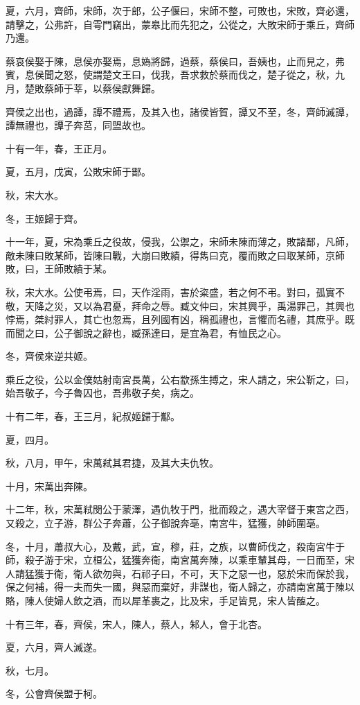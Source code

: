 \begin{pinyinscope}
夏，六月，齊師，宋師，次于郎，公子偃曰，宋師不整，可敗也，宋敗，齊必還，請擊之，公弗許，自雩門竊出，蒙皋比而先犯之，公從之，大敗宋師于乘丘，齊師乃還。

蔡哀侯娶于陳，息侯亦娶焉，息媯將歸，過蔡，蔡侯曰，吾姨也，止而見之，弗賓，息侯聞之怒，使謂楚文王曰，伐我，吾求救於蔡而伐之，楚子從之，秋，九月，楚敗蔡師于莘，以蔡侯獻舞歸。

齊侯之出也，過譚，譚不禮焉，及其入也，諸侯皆賀，譚又不至，冬，齊師滅譚，譚無禮也，譚子奔莒，同盟故也。

十有一年，春，王正月。

夏，五月，戊寅，公敗宋師于鄑。

秋，宋大水。

冬，王姬歸于齊。

十一年，夏，宋為乘丘之役故，侵我，公禦之，宋師未陳而薄之，敗諸鄑，凡師，敵未陳曰敗某師，皆陳曰戰，大崩曰敗績，得雋曰克，覆而敗之曰取某師，京師敗，曰，王師敗績于某。

秋，宋大水。公使弔焉，曰，天作淫雨，害於粢盛，若之何不弔。對曰，孤實不敬，天降之災，又以為君憂，拜命之辱。臧文仲曰，宋其興乎，禹湯罪己，其興也悖焉，桀紂罪人，其亡也忽焉，且列國有凶，稱孤禮也，言懼而名禮，其庶乎。既而聞之曰，公子御說之辭也，臧孫達曰，是宜為君，有恤民之心。

冬，齊侯來逆共姬。

乘丘之役，公以金僕姑射南宮長萬，公右歂孫生搏之，宋人請之，宋公靳之，曰，始吾敬子，今子魯囚也，吾弗敬子矣，病之。

十有二年，春，王三月，紀叔姬歸于酅。

夏，四月。

秋，八月，甲午，宋萬弒其君捷，及其大夫仇牧。

十月，宋萬出奔陳。

十二年，秋，宋萬弒閔公于蒙澤，遇仇牧于門，批而殺之，遇大宰督于東宮之西，又殺之，立子游，群公子奔蕭，公子御說奔亳，南宮牛，猛獲，帥師圍亳。

冬，十月，蕭叔大心，及戴，武，宣，穆，莊，之族，以曹師伐之，殺南宮牛于師，殺子游于宋，立桓公，猛獲奔衛，南宮萬奔陳，以乘車輦其母，一日而至，宋人請猛獲于衛，衛人欲勿與，石祁子曰，不可，天下之惡一也，惡於宋而保於我，保之何補，得一夫而失一國，與惡而棄好，非謀也，衛人歸之，亦請南宮萬于陳以賂，陳人使婦人飲之酒，而以犀革裹之，比及宋，手足皆見，宋人皆醢之。

十有三年，春，齊侯，宋人，陳人，蔡人，邾人，會于北杏。

夏，六月，齊人滅遂。

秋，七月。

冬，公會齊侯盟于柯。


\end{pinyinscope}
